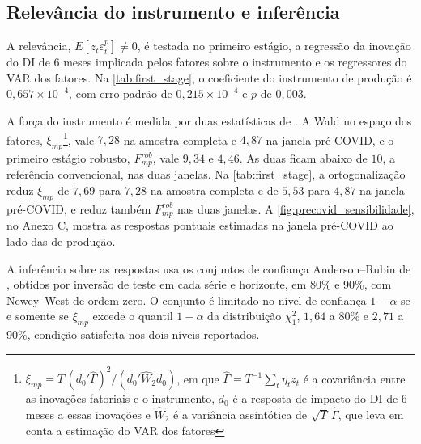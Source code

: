 \documentclass[preprint,authoryear,review,12pt]{elsarticle}
\begin{document}
\subsection{Relevância do instrumento e inferência}

A relevância, $E[z_t \varepsilon_t^{p}] \neq 0$, é testada no primeiro estágio, a regressão da inovação do DI de 6 meses implicada pelos fatores sobre o instrumento e os regressores do VAR dos fatores. Na \autoref{tab:first_stage}, o coeficiente do instrumento de produção é $0{,}657 \times 10^{-4}$, com erro-padrão de $0{,}215 \times 10^{-4}$ e $p$ de $0{,}003$.

A força do instrumento é medida por duas estatísticas de \cite{montielolea}. A Wald no espaço dos fatores, $\xi_{mp}$\footnote{$\xi_{mp} = T\,(d_0'\hat{\Gamma})^2/(d_0'\hat{W}_2 d_0)$, em que $\hat{\Gamma} = T^{-1}\sum_t \eta_t z_t$ é a covariância entre as inovações fatoriais e o instrumento, $d_0$ é a resposta de impacto do DI de 6 meses a essas inovações e $\hat{W}_2$ é a variância assintótica de $\sqrt{T}\,\hat{\Gamma}$, que leva em conta a estimação do VAR dos fatores}, vale $7{,}28$ na amostra completa e $4{,}87$ na janela pré-COVID, e o primeiro estágio robusto, $F^{rob}_{mp}$, vale $9{,}34$ e $4{,}46$. As duas ficam abaixo de $10$, a referência convencional, nas duas janelas. Na \autoref{tab:first_stage}, a ortogonalização reduz $\xi_{mp}$ de $7{,}69$ para $7{,}28$ na amostra completa e de $5{,}53$ para $4{,}87$ na janela pré-COVID, e reduz também $F^{rob}_{mp}$ nas duas janelas. A \autoref{fig:precovid_sensibilidade}, no Anexo C, mostra as respostas pontuais estimadas na janela pré-COVID ao lado das de produção.

A inferência sobre as respostas usa os conjuntos de confiança Anderson--Rubin de \cite{montielolea}, obtidos por inversão de teste em cada série e horizonte, em 80\% e 90\%, com Newey--West de ordem zero. O conjunto é limitado no nível de confiança $1-\alpha$ se e somente se $\xi_{mp}$ excede o quantil $1-\alpha$ da distribuição $\chi^2_1$, $1{,}64$ a 80\% e $2{,}71$ a 90\%, condição satisfeita nos dois níveis reportados.
\end{document}
